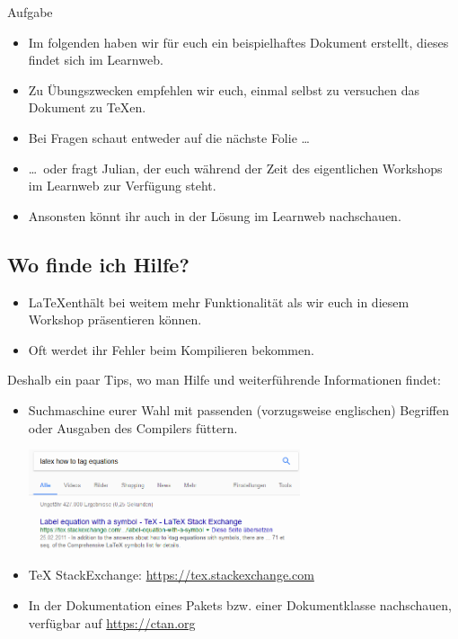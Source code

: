 \documentclass[german]{f1rstlady/templates/presentation}
\begin{document}
\begin{frame}{Aufgabe}
\begin{itemize}
    \item Im folgenden haben wir für euch ein beispielhaftes Dokument erstellt, dieses findet sich
        im Learnweb.
    \item Zu Übungszwecken empfehlen wir euch, einmal selbst zu versuchen das Dokument zu TeXen.
    \item Bei Fragen schaut entweder auf die nächste Folie \dots
    \item \dots\ oder fragt Julian, der euch während der Zeit des eigentlichen Workshops im Learnweb
        zur Verfügung steht.
    \item Ansonsten könnt ihr auch in der Lösung im Learnweb nachschauen.
\end{itemize}
\end{frame}

\subsection{Wo finde ich Hilfe?}

\begin{frame}{\subsecname}
\begin{itemize}
    \item \LaTeX enthält bei weitem mehr Funktionalität als wir euch in diesem Workshop präsentieren
        können.
    \item Oft werdet ihr Fehler beim Kompilieren bekommen.
\end{itemize}
Deshalb ein paar Tips, wo man Hilfe und weiterführende Informationen findet:
\begin{itemize}
    \item \alert{Suchmaschine} eurer Wahl mit passenden (vorzugsweise englischen) Begriffen oder
        Ausgaben des Compilers füttern.
	\begin{center}
		\includegraphics[keepaspectratio,width=8cm]{images/google.png}
	\end{center}
	\item \alert{TeX StackExchange}: \url{https://tex.stackexchange.com}
    \item In der \alert{Dokumentation} eines Pakets bzw. einer Dokumentklasse nachschauen, verfügbar
        auf \url{https://ctan.org}
\end{itemize}
\end{frame}
\end{document}
